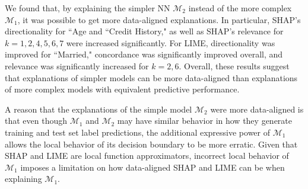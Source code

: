 \documentclass[12pt]{article}  %
\begin{document}
            We found that, by explaining the simpler NN $\mathcal{M}_2$ instead of the more complex $\mathcal{M}_1$, it was possible to get more data-aligned explanations. %
            In particular, SHAP's directionality for ``Age and ``Credit History," as well as SHAP's relevance for $k=1,2,4,5,6,7$ were increased significantly. 
            For LIME, directionality was improved for ``Married," concordance was significantly improved overall, and relevance was significantly increased for $k=2,6$. Overall, these results suggest that explanations of simpler models can be more data-aligned than explanations of more complex models with equivalent predictive performance. 
            
            A reason that the explanations of the simple model $\mathcal{M}_2$ were more data-aligned is that even though $\mathcal{M}_1$ and $\mathcal{M}_2$ may have similar behavior in how they generate training and test set label predictions, the additional expressive power of $\mathcal{M}_1$ allows the local behavior of its decision boundary to be more erratic. Given that SHAP and LIME are local function approximators, incorrect local behavior of $\mathcal{M}_1$ imposes a limitation on how data-aligned SHAP and LIME can be when explaining $\mathcal{M}_1$. 
\end{document}
